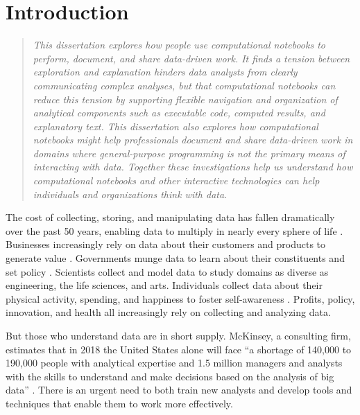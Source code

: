 \chapter{Introduction}

\begin{quote}
\emph{This dissertation explores how people use computational notebooks to perform, document, and share data-driven work. It finds a tension between exploration and explanation hinders data analysts from clearly communicating complex analyses, but that computational notebooks can reduce this tension by supporting flexible navigation and organization of analytical components such as executable code, computed results, and explanatory text. This dissertation also explores how computational notebooks might help professionals document and share data-driven work in domains where general-purpose programming is not the primary means of interacting with data. Together these investigations help us understand how computational notebooks and other interactive technologies can help individuals and organizations think with data.}
\end{quote}

\vspace{0.25in}

The cost of collecting, storing, and manipulating data has fallen dramatically over the past 50 years, enabling data to multiply in nearly every sphere of life \cite{reinsel2017data}. Businesses increasingly rely on data about their customers and products to generate value \cite{kandel2012enterprise}. Governments munge data to learn about their constituents and set policy \cite{le2015planning, chicago, nyc}. Scientists collect and model data to study domains as diverse as engineering, the life sciences, and arts. Individuals collect data about their physical activity, spending, and happiness to foster self-awareness \cite{epstein2015lived,li2010stage}. Profits, policy, innovation, and health all increasingly rely on collecting and analyzing data.

But those who understand data are in short supply. McKinsey, a consulting firm, estimates that in 2018 the United States alone will face ``a shortage of 140,000 to 190,000 people with analytical expertise and 1.5 million managers and analysts with the skills to understand and make decisions based on the analysis of big data'' \cite{manyika2011big}. There is an urgent need to both train new analysts and develop tools and techniques that enable them to work more effectively.

